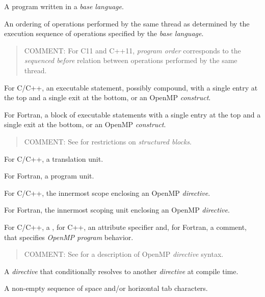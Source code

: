 \glossarydefstart
A program written in a \emph{base language}.
\glossarydefend

\glossarydefstart
An ordering of operations performed by the same thread as determined by the
execution sequence of operations specified by the \emph{base language}.

\begin{quote}
COMMENT: For C11 and C++11, \emph{program order} corresponds to the 
\emph{sequenced before} relation between operations performed by the 
same thread.
\end{quote}
\glossarydefend

\glossarydefstart
For C/C++, an executable statement, possibly compound, with a single 
entry at the top and a single exit at the bottom, or an OpenMP 
\emph{construct}.

For Fortran, a block of executable statements with a single entry at 
the top and a single exit at the bottom, or an OpenMP \emph{construct}.

\begin{quote}
COMMENT:
See  for restrictions on \emph{structured blocks}.
\end{quote}
\glossarydefend

\glossarydefstart
For C/C++, a translation unit.

For Fortran, a program unit.
\glossarydefend

\glossarydefstart
For C/C++, the innermost scope enclosing an OpenMP \emph{directive}.

For Fortran, the innermost scoping unit enclosing an OpenMP \emph{directive}.
\glossarydefend

\glossarydefstart
For C/C++, a , for C++, an attribute specifier and, for Fortran, a comment, that
specifies \emph{OpenMP program} behavior.

\begin{quote}
COMMENT: See  for a description of OpenMP 
\emph{directive} syntax. 
\end{quote}
\glossarydefend

\glossarydefstart
A \emph{directive} that conditionally resolves to another \emph{directive} 
at compile time.
\glossarydefend


\glossarydefstart
A non-empty sequence of space and/or horizontal tab characters.
\glossarydefend

